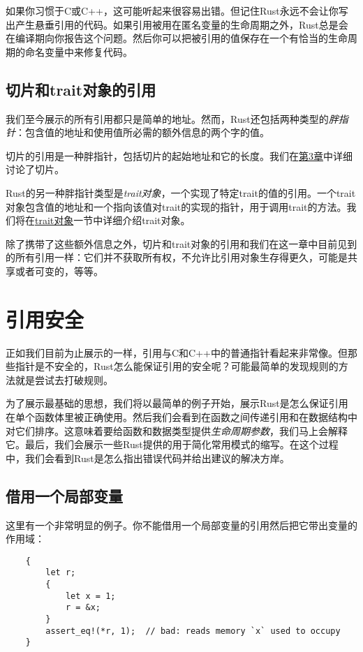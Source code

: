 如果你习惯于C或C++，这可能听起来很容易出错。但记住Rust永远不会让你写出产生悬垂引用的代码。如果引用被用在匿名变量的生命周期之外，Rust总是会在编译期向你报告这个问题。然后你可以把被引用的值保存在一个有恰当的生命周期的命名变量中来修复代码。

\subsection{切片和trait对象的引用}
我们至今展示的所有引用都只是简单的地址。然而，Rust还包括两种类型的\emph{胖指针}：包含值的地址和使用值所必需的额外信息的两个字的值。

切片的引用是一种胖指针，包括切片的起始地址和它的长度。我们在\hyperref[ch03]{第3章}中详细讨论了切片。

Rust的另一种胖指针类型是\emph{trait对象}，一个实现了特定trait的值的引用。一个trait对象包含值的地址和一个指向该值对trait的实现的指针，用于调用trait的方法。我们将在\hyperref[traitobject]{trait对象}一节中详细介绍trait对象。

除了携带了这些额外信息之外，切片和trait对象的引用和我们在这一章中目前见到的所有引用一样：它们并不获取所有权，不允许比引用对象生存得更久，可能是共享或者可变的，等等。

\section{引用安全}

正如我们目前为止展示的一样，引用与C和C++中的普通指针看起来非常像。但那些指针是不安全的，Rust怎么能保证引用的安全呢？可能最简单的发现规则的方法就是尝试去打破规则。

为了展示最基础的思想，我们将以最简单的例子开始，展示Rust是怎么保证引用在单个函数体里被正确使用。然后我们会看到在函数之间传递引用和在数据结构中对它们排序。这意味着要给函数和数据类型提供\emph{生命周期参数}，我们马上会解释它。最后，我们会展示一些Rust提供的用于简化常用模式的缩写。在这个过程中，我们会看到Rust是怎么指出错误代码并给出建议的解决方岸。

\subsection{借用一个局部变量}

这里有一个非常明显的例子。你不能借用一个局部变量的引用然后把它带出变量的作用域：
\begin{verbatim}
    {
        let r;
        {
            let x = 1;
            r = &x;
        }
        assert_eq!(*r, 1);  // bad: reads memory `x` used to occupy
    }
\end{verbatim}

